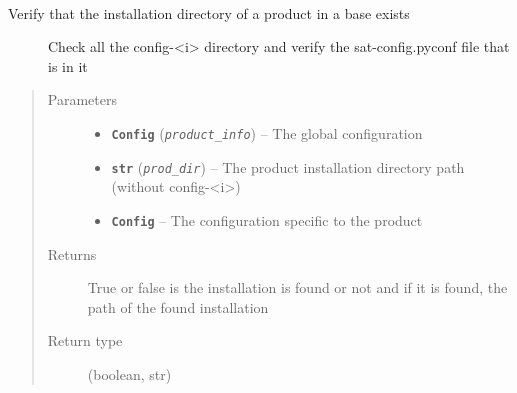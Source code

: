 \documentclass[a4paper,10pt,english]{sphinxmanual}
\begin{document}
\begin{fulllineitems}
\label{commands/apidoc/src:src.product.check_config_exists}~\begin{description}
\item[{Verify that the installation directory of a product in a base exists}] \leavevmode
Check all the config-\textless{}i\textgreater{} directory and verify the sat-config.pyconf file
that is in it

\end{description}
\begin{quote}\begin{description}
\item[{Parameters}] \leavevmode\begin{itemize}
\item {} 
\textbf{\texttt{Config}} (\emph{\texttt{product\_info}}) -- The global configuration

\item {} 
\textbf{\texttt{str}} (\emph{\texttt{prod\_dir}}) -- The product installation directory path 
(without config-\textless{}i\textgreater{})

\item {} 
\textbf{\texttt{Config}} -- The configuration specific to 
the product

\end{itemize}

\item[{Returns}] \leavevmode
True or false is the installation is found or not 
and if it is found, the path of the found installation

\item[{Return type}] \leavevmode
(boolean, str)

\end{description}\end{quote}

\end{fulllineitems}

\end{document}
